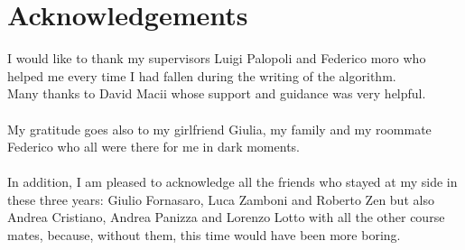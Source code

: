 \chapter*{Acknowledgements}
\thispagestyle{empty}

I would like to thank my supervisors Luigi Palopoli and Federico moro who helped me every time I had fallen during the writing of the algorithm.
\\
Many thanks to David Macii whose support and guidance was very helpful.
\\ \\
My gratitude goes also to my girlfriend Giulia, my family and my roommate Federico who all were there for me in dark moments.
\\ \\
In addition, I am pleased to acknowledge all the friends who stayed at my side in these three years:
Giulio Fornasaro, Luca Zamboni and Roberto Zen but also Andrea Cristiano, Andrea Panizza and Lorenzo Lotto with all the other course mates, because, without them, this time would have been more boring.

